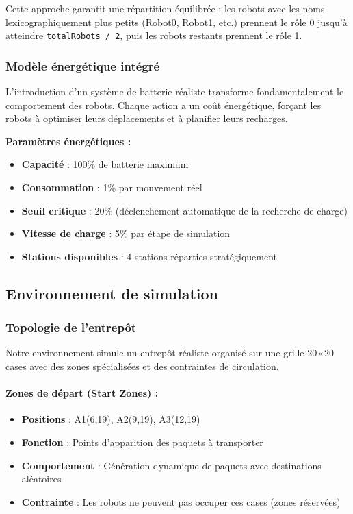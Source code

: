 \documentclass[12pt,a4paper]{article}
\newcommand{\code}[1]{\texttt{#1}}
\begin{document}
Cette approche garantit une répartition équilibrée : les robots avec les noms lexicographiquement plus petits (Robot0, Robot1, etc.) prennent le rôle 0 jusqu'à atteindre \code{totalRobots / 2}, puis les robots restants prennent le rôle 1.

\subsubsection{Modèle énergétique intégré}

L'introduction d'un système de batterie réaliste transforme fondamentalement le comportement des robots. Chaque action a un coût énergétique, forçant les robots à optimiser leurs déplacements et à planifier leurs recharges.

\textbf{Paramètres énergétiques :}
\begin{itemize}
    \item \textbf{Capacité} : 100\% de batterie maximum
    \item \textbf{Consommation} : 1\% par mouvement réel
    \item \textbf{Seuil critique} : 20\% (déclenchement automatique de la recherche de charge)
    \item \textbf{Vitesse de charge} : 5\% par étape de simulation
    \item \textbf{Stations disponibles} : 4 stations réparties stratégiquement
\end{itemize}

\subsection{Environnement de simulation}

\subsubsection{Topologie de l'entrepôt}

Notre environnement simule un entrepôt réaliste organisé sur une grille 20×20 cases avec des zones spécialisées et des contraintes de circulation.

\paragraph{Zones de départ (Start Zones) :}
\begin{itemize}
    \item \textbf{Positions} : A1(6,19), A2(9,19), A3(12,19)
    \item \textbf{Fonction} : Points d'apparition des paquets à transporter
    \item \textbf{Comportement} : Génération dynamique de paquets avec destinations aléatoires
    \item \textbf{Contrainte} : Les robots ne peuvent pas occuper ces cases (zones réservées)
\end{itemize}
\end{document}
